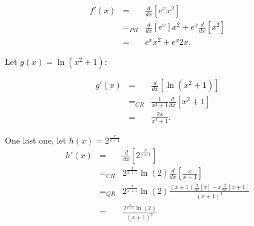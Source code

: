 \documentclass[10pt]{article}
\theoremstyle{definition}
\begin{document}
\begin{eqnarray*}
f'(x)&=&\frac{d}{dx}[e^xx^2]\\
&=_{PR}&\frac{d}{dx}[e^x]x^2+e^x\frac{d}{dx}[x^2]\\
&=&e^xx^2+e^x2x.
\end{eqnarray*}

Let $g(x)=\ln(x^2+1)$:

\begin{eqnarray*}
g'(x)&=&\frac{d}{dx}[\ln(x^2+1)]\\
&=_{CR}&\frac{1}{x^2+1}\frac{d}{dx}[x^2+1]\\
&=&\frac{2x}{x^2+1}.
\end{eqnarray*}

One last one, let $h(x)=2^{\frac{x}{x+1}}$\\

\begin{eqnarray*}
h'(x)&=&\frac{d}{dx}[2^{\frac{x}{x+1}}]\\
&=_{CR}&2^{\frac{x}{x+1}}\ln(2)\frac{d}{dx}[\frac{x}{x+1}]\\
&=_{QR}&2^{\frac{x}{x+1}}\ln(2)\frac{(x+1)\frac{d}{dx}[x]-x\frac{d}{dx}[x+1]}{(x+1)^2}\\
&=&\frac{2^{\frac{x}{x+1}}\ln(2)}{(x+1)^2}
\end{eqnarray*}
\end{document}
